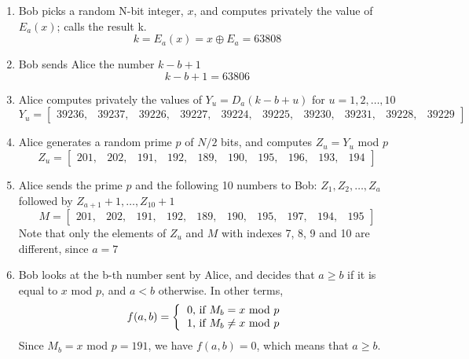\begin{enumerate}
\item Bob picks a random N-bit integer, $x$, and computes privately the value of $E_a(x)$; calls the result k.
\begin{equation}\label{eq:encryptingX}
k = E_a(x) = x \oplus E_a = 63808
\end{equation}
\item Bob sends Alice the number $k - b + 1$
\begin{equation}\label{eq:encryptingX}
k - b + 1 = 63806
\end{equation}
\item Alice computes privately the values of $Y_u = D_a(k - b + u)$ for $u = 1,2,\ldots,10$\\
\[
Y_u = \begin{bmatrix}
        39236,&39237,&39226,&39227,&39224,&39225,&39230,&39231,&39228,&39229
      \end{bmatrix}
\]
\item Alice generates a random prime $p$ of $N/2$ bits, and computes $Z_u = Y_u$  mod  $p$
\[
Z_u = \begin{bmatrix}
        201,&202,&191,&192,&189,&190,&195,&196,&193,&194
      \end{bmatrix}
\]
\item Alice sends the prime $p$ and the following 10 numbers to Bob: $Z_1,Z_2,\ldots,Z_a$
followed by $Z_{a+1}+1,\ldots,Z_{10}+1$
\[
M = \begin{bmatrix}
        201,&202,&191,&192,&189,&190,&195,&197,&194,&195
      \end{bmatrix}
\]
Note that only the elements of $Z_u$ and $M$ with indexes 7, 8, 9 and 10 are different, since $a = 7$
\item Bob looks at the b-th number sent by Alice, and decides that $a \geq b$ if it is equal to $x$ mod $p$,
and $a < b$ otherwise. In other terms,
\[
f(a,b) = \left \{
          \begin{tabular}{ccc}
          0, if $M_b = x$ mod $p$ \\
          1, if $M_b \ne x$ mod $p$
          \end{tabular}
        \right.
\]
Since $M_b = x$ mod $p = 191$, we have $f(a,b) = 0$, which means that $a \geq b$.
\end{enumerate}


